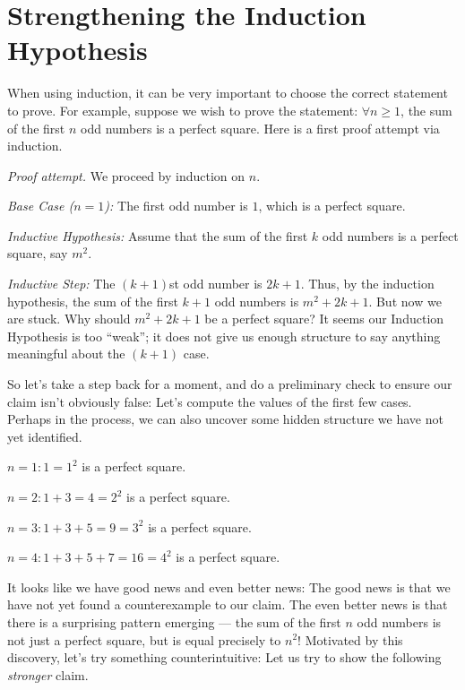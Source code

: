 \documentclass[11pt]{article}
\begin{document}
\section{Strengthening the Induction Hypothesis}

When using induction, it can be very important to choose the correct statement to prove. For example, suppose we wish to prove the statement: $\forall n \geq 1$, the sum of the first $n$ odd numbers is a perfect square. Here is a first proof attempt via induction.

\emph{Proof attempt.} We proceed by induction on $n$.

\emph{Base Case ($n = 1$):} The first odd number is $1$, which is a perfect square.

\emph{Inductive Hypothesis:} Assume that the sum of the first $k$
odd numbers is a perfect square, say $m^2$.

\emph{Inductive Step:} The $(k+1)$st odd number is $2k+1$. Thus, by the induction hypothesis, the sum of the first $k+1$ odd numbers is $m^2 + 2k +1$. But now we are stuck. Why should $m^2 + 2k+1$ be a perfect square? It seems our Induction Hypothesis is too ``weak''; it does not give us enough structure to say anything meaningful about the $(k+1)$ case.

So let's take a step back for a moment, and do a preliminary check to ensure our claim isn't obviously false: Let's compute the values of the first few cases. Perhaps in the process, we can also uncover some hidden structure we have not yet identified.
\begin{compactitem}
\item $n = 1: 1 = 1^2$ is a perfect square.
\item $n = 2: 1 + 3 = 4 = 2^2$ is a perfect square.
\item $n = 3: 1 + 3 + 5 = 9 = 3^2$ is a perfect square.
\item $n = 4: 1 + 3 + 5 + 7 = 16 = 4^2$ is a perfect square.
\end{compactitem}
It looks like we have good news and even better news: The good news is that we have not yet found a counterexample to our claim. The even better news is that there is a surprising pattern emerging --- the sum of the first $n$ odd numbers is not just a perfect square, but is equal precisely to $n^2$! Motivated by this discovery, let's try something counterintuitive: Let us try to show the following \emph{stronger} claim.
\end{document}
